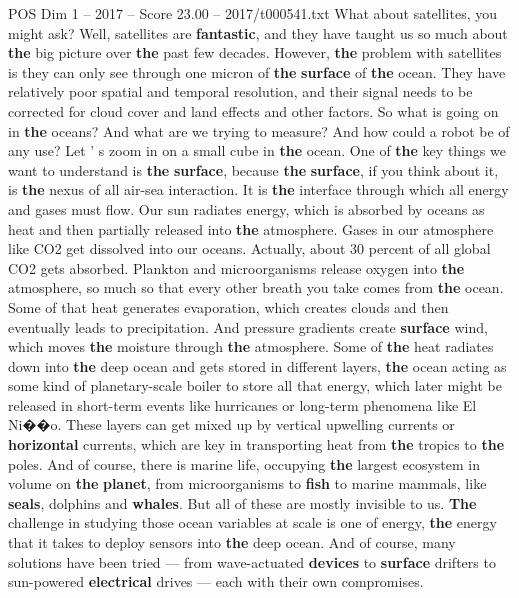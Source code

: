 \begin{textsample}{POS Dim 1 – 2017 – Score 23.00 – 2017/t000541.txt}
What about satellites, you might ask?
Well, satellites are \textbf{fantastic}, and they have taught us so much about \textbf{the} big picture over \textbf{the} past few decades.
However, \textbf{the} problem with satellites is they can only see through one micron of \textbf{the} \textbf{surface} of \textbf{the} ocean.
They have relatively poor spatial and temporal resolution, and their signal needs to be corrected for cloud cover and land effects and other factors.
So what is going on in \textbf{the} oceans?
And what are we trying to measure?
And how could a robot be of any use?
Let ' s zoom in on a small cube in \textbf{the} ocean.
One of \textbf{the} key things we want to understand is \textbf{the} \textbf{surface}, because \textbf{the} \textbf{surface}, if you think about it, is \textbf{the} nexus of all air-sea interaction.
It is \textbf{the} interface through which all energy and gases must flow.
Our sun radiates energy, which is absorbed by oceans as heat and then partially released into \textbf{the} atmosphere.
Gases in our atmosphere like CO2 get dissolved into our oceans.
Actually, about 30 percent of all global CO2 gets absorbed.
Plankton and microorganisms release oxygen into \textbf{the} atmosphere, so much so that every other breath you take comes from \textbf{the} ocean.
Some of that heat generates evaporation, which creates clouds and then eventually leads to precipitation.
And pressure gradients create \textbf{surface} wind, which moves \textbf{the} moisture through \textbf{the} atmosphere.
Some of \textbf{the} heat radiates down into \textbf{the} deep ocean and gets stored in different layers, \textbf{the} ocean acting as some kind of planetary-scale boiler to store all that energy, which later might be released in short-term events like hurricanes or long-term phenomena like El Ni{\EmojiFont �}{\EmojiFont �}o.
These layers can get mixed up by vertical upwelling currents or \textbf{horizontal} currents, which are key in transporting heat from \textbf{the} tropics to \textbf{the} poles.
And of course, there is marine life, occupying \textbf{the} largest ecosystem in volume on \textbf{the} \textbf{planet}, from microorganisms to \textbf{fish} to marine mammals, like \textbf{seals}, dolphins and \textbf{whales}.
But all of these are mostly invisible to us. \textbf{The} challenge in studying those ocean variables at scale is one of energy, \textbf{the} energy that it takes to deploy sensors into \textbf{the} deep ocean.
And of course, many solutions have been tried — from wave-actuated \textbf{devices} to \textbf{surface} drifters to sun-powered \textbf{electrical} drives — each with their own compromises.

\end{textsample}
